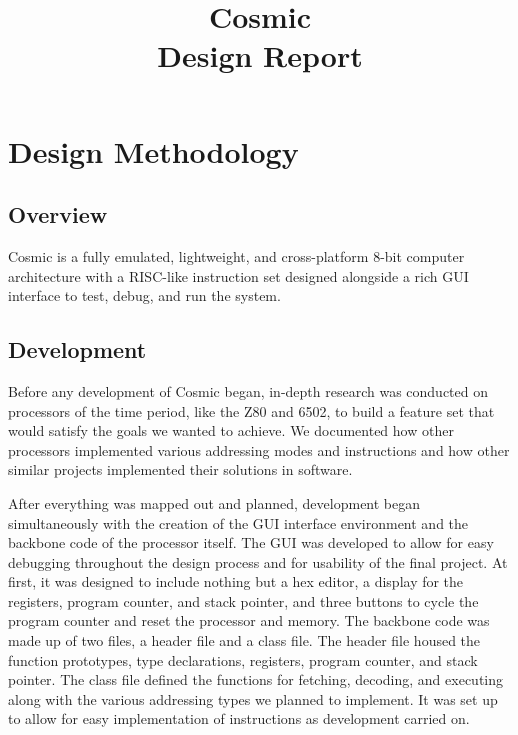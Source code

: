 \documentclass[conference]{IEEEtran}
\begin{document}
\title{
 Cosmic\\Design Report}

\author{
\and
{}

}

\maketitle

\section{Design Methodology}
\subsection{Overview}
Cosmic is a fully emulated, lightweight, and cross-platform 8-bit computer architecture with a RISC-like instruction set designed alongside a rich GUI interface to test, debug, and run the system.

\subsection{Development}
Before any development of Cosmic began, in-depth research was conducted on processors of the time period, like the Z80 and 6502, to build a feature set that would satisfy the goals we wanted to achieve. We documented how other processors implemented various addressing modes and instructions and how other similar projects implemented their solutions in software.

After everything was mapped out and planned, development began simultaneously with the creation of the GUI interface environment and the backbone code of the processor itself. The GUI was developed to allow for easy debugging throughout the design process and for usability of the final project. At first, it was designed to include nothing but a hex editor, a display for the registers, program counter, and stack pointer, and three buttons to cycle the program counter and reset the processor and memory. The backbone code was made up of two files, a header file and a class file. The header file housed the function prototypes, type declarations, registers, program counter, and stack pointer. The class file defined the functions for fetching, decoding, and executing along with the various addressing types we planned to implement. It was set up to allow for easy implementation of instructions as development carried on.
\end{document}
